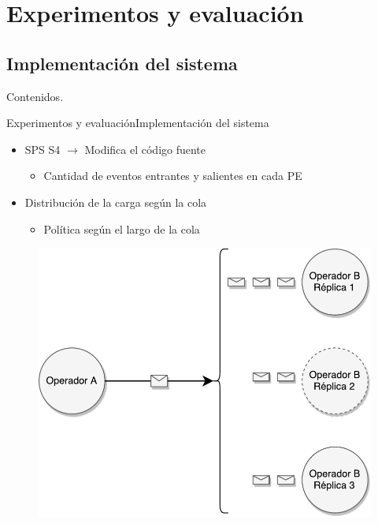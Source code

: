 \section{Experimentos y evaluación}
\subsection*{Implementación del sistema}

\addtocounter{framenumber}{-1}
\begin{frame}[t]{Contenidos}{\textcolor{UniBlue}{.}}
	\tableofcontents[currentsection]
\end{frame}

\begin{frame}{Experimentos y evaluación}{Implementación del sistema}
\begin{itemize}
\item SPS S4 $\rightarrow$ Modifica el código fuente
	\begin{itemize}
		\item Cantidad de eventos entrantes y salientes en cada PE
	\end{itemize}
\item Distribución de la carga según la cola
	\begin{itemize}
		\item Política según el largo de la cola
	\end{itemize}
\end{itemize}

\begin{figure}
  \center
    \includegraphics[scale=0.35]{images/DistribucionCarga-I.pdf}
\end{figure}
\end{frame}

